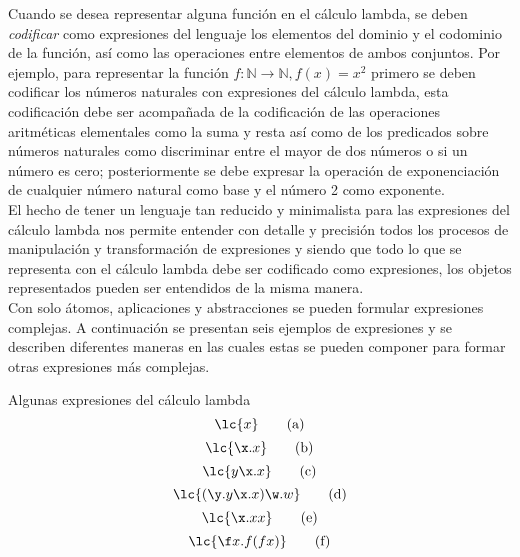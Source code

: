 Cuando se desea representar alguna función en el cálculo lambda, se deben
\emph{codificar} como expresiones del lenguaje los elementos del dominio y el
codominio de la función, así como las operaciones entre elementos de ambos
conjuntos. Por ejemplo, para representar la función \(f : \mathbb{N} \to
\mathbb{N}, f(x)=x^{2}\) primero se deben codificar los números naturales con
expresiones del cálculo lambda, esta codificación debe ser acompañada de la
codificación de las operaciones aritméticas elementales como la suma y resta así
como de los predicados sobre números naturales como discriminar entre el mayor
de dos números o si un número es cero; posteriormente se debe expresar la
operación de exponenciación de cualquier número natural como base y el número 2
como exponente. \\

El hecho de tener un lenguaje tan reducido y minimalista para las expresiones
del cálculo lambda nos permite entender con detalle y precisión todos los
procesos de manipulación y transformación de expresiones y siendo que todo lo
que se representa con el cálculo lambda debe ser codificado como expresiones,
los objetos representados pueden ser entendidos de la misma manera. \\

Con solo átomos, aplicaciones y abstracciones se pueden formular expresiones
complejas. A continuación se presentan seis ejemplos de expresiones y se
describen diferentes maneras en las cuales estas se pueden componer para formar
otras expresiones más complejas. \\

\begin{ejemplo} Algunas expresiones del cálculo lambda
  \label{ejemplo:expresiones1}
  \begin{equation} \label{ejemplo:expresiones1:a}
    \lc{x} \tag{a}
  \end{equation}
  \begin{equation} \label{ejemplo:expresiones1:b}
    \lc{\x.x} \tag{b}
  \end{equation}
  \begin{equation} \label{ejemplo:expresiones1:c}
    \lc{y\x.x} \tag{c}
  \end{equation}
  \begin{equation} \label{ejemplo:expresiones1:d}
    \lc{(\y.y\x.x)\w.w} \tag{d}
  \end{equation}
  \begin{equation} \label{ejemplo:expresiones1:e}
    \lc{\x.x x} \tag{e}
  \end{equation}
  \begin{equation} \label{ejemplo:expresiones1:f}
    \lc{\f x.f(f x)} \tag{f}
  \end{equation}
\end{ejemplo}

